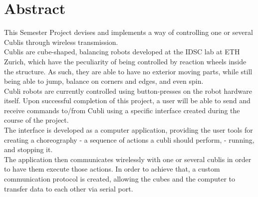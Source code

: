 




 \setcounter{tocdepth}{2}
 \tableofcontents

 \cleardoublepage


\chapter*{Abstract}

This Semester Project devises and implements a way of controlling one or several Cublis through wireless transmission.\\ 

Cublis are cube-shaped, balancing robots developed at the IDSC lab at ETH Zurich, which have the peculiarity of being controlled by reaction wheels inside the structure. As such, they are able to have no exterior moving parts, while still being able to jump, balance on corners and edges, and even spin.\\ 

Cubli robots are currently controlled using button-presses on the robot hardware itself. Upon successful completion of this project, a user will be able to send and receive commands to/from Cubli using a specific interface created during the course of the project.\\

The interface is developed as a computer application, providing the user tools for creating a choreography - a sequence of actions a cubli should perform, - running, and stopping it.\\ 

The application then communicates wirelessly with one or several cublis in order to have them execute those actions. In order to achieve that, a custom communication protocol is created, allowing the cubes and the computer to transfer data to each other via serial port.\\ 

